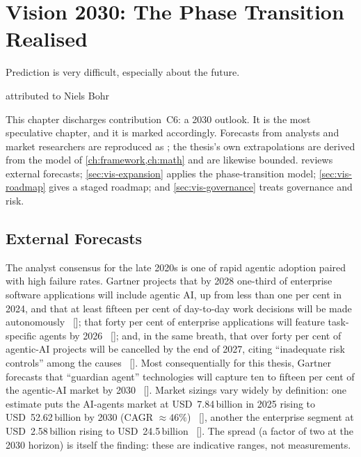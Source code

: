 \chapter{Vision 2030: The Phase Transition Realised}
\label{ch:vision}

\epigraph{Prediction is very difficult, especially about the future.}{attributed
to Niels Bohr}

This chapter discharges contribution~C6: a 2030 outlook. It is the most
speculative chapter, and it is marked accordingly. Forecasts from analysts and
market researchers are reproduced as \forecast; the thesis's own extrapolations
are derived from the model of \cref{ch:framework,ch:math} and are likewise bounded.
 reviews external forecasts; \cref{sec:vis-expansion}
applies the phase-transition model; \cref{sec:vis-roadmap} gives a staged roadmap;
and \cref{sec:vis-governance} treats governance and risk.

\section{External Forecasts}
\label{sec:vis-forecasts}

The analyst consensus for the late 2020s is one of rapid agentic adoption paired
with high failure rates. Gartner projects that by 2028 one-third of enterprise
software applications will include agentic AI, up from less than one per cent in
2024, and that at least fifteen per cent of day-to-day work decisions will be made
autonomously \citep{gartner-agentic-2025}~[\forecast]; that forty per cent of
enterprise applications will feature task-specific agents by 2026
\citep{gartner-taskagents-2025}~[\forecast]; and, in the same breath, that over
forty per cent of agentic-AI projects will be cancelled by the end of 2027, citing
``inadequate risk controls'' among the causes
\citep{gartner-agentic-2025}~[\forecast]. Most consequentially for this thesis,
Gartner forecasts that ``guardian agent'' technologies will capture ten to fifteen
per cent of the agentic-AI market by 2030 \citep{gartner-guardian-2025}~[\forecast].
Market sizings vary widely by definition: one estimate puts the AI-agents market at
USD~7.84\,billion in 2025 rising to USD~52.62\,billion by 2030 (CAGR ${\approx}46\%$)
\citep{marketsandmarkets-aiagents}~[\forecast], another the enterprise segment at
USD~2.58\,billion rising to USD~24.5\,billion \citep{grandview-agentic}~[\forecast].
The spread (a factor of two at the 2030 horizon) is itself the finding: these are
indicative ranges, not measurements.

